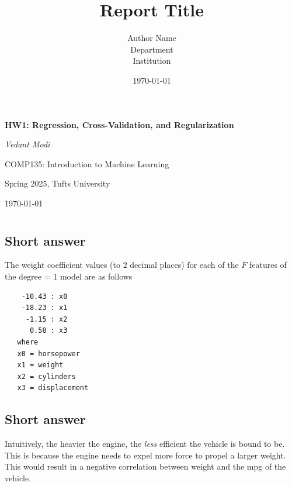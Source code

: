 \documentclass[12pt]{article}
\title{\textbf{Report Title}}
\author{Author Name \\ Department \\ Institution}
\date{\today}
\begin{document}
\begin{titlepage}
    \centering
    \vspace*{2cm}
    {\Huge\bfseries HW1: Regression, Cross-Validation, and Regularization\par}
    \vspace{1.5cm}
    {\Large\itshape Vedant Modi\par}
    \vspace{0.5cm}
    {\large COMP135: Introduction to Machine Learning\par}
    {\large Spring 2025, Tufts University \par}
    \vspace{2cm}
    {\large \today\par}
    \vfill
\end{titlepage}

\newpage



\section{}
\subsection{Short answer}
The weight coefficient values (to 2 decimal places) for each of the $F$
 features of the degree = 1 model are as follows
\begin{verbatim}
    -10.43 : x0
    -18.23 : x1
     -1.15 : x2
      0.58 : x3
   where 
   x0 = horsepower
   x1 = weight
   x2 = cylinders
   x3 = displacement
\end{verbatim}

\subsection{Short answer}
Intuitively, the heavier the engine, the \textit{less} efficient the vehicle is
bound to be. This is because the engine needs to expel more force to propel a
larger weight. This would result in a negative correlation between weight and
the mpg of the vehicle.
\end{document}
